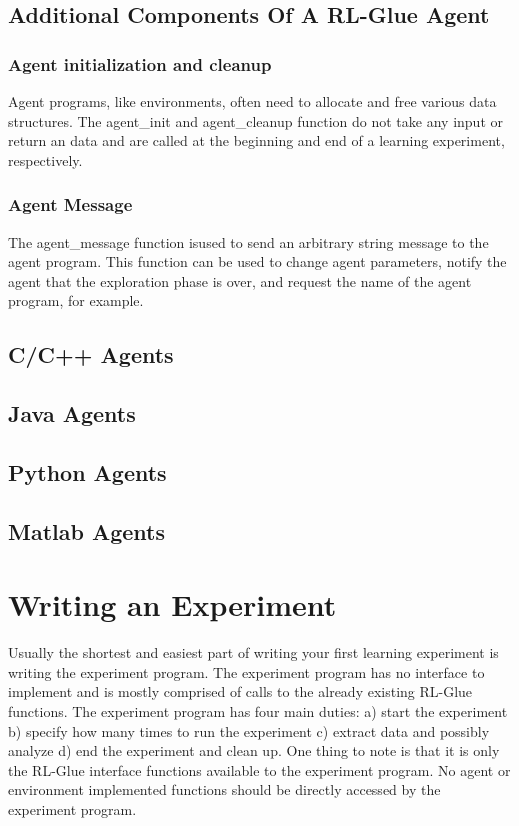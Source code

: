 \documentclass[11pt]{article}
\begin{document}
\subsection{Additional Components Of A RL-Glue Agent}
\subsubsection{Agent initialization and cleanup}
Agent programs, like environments, often need to allocate and free various data structures. The agent\_init and agent\_cleanup function do not take any input or return an data and are called at the beginning and end of a learning experiment, respectively.  

\subsubsection{Agent Message}
The agent\_message function isused to send an arbitrary string message to the agent program. This function can be used to change agent parameters, notify the agent that the exploration phase is over, and request the name of the agent program, for example.

\subsection{C/C++ Agents}
\subsection{Java Agents}
\subsection{Python Agents}
\subsection{Matlab Agents}

\section{Writing an Experiment}
\label{exp}
Usually the shortest and easiest part of writing your first learning experiment is writing the experiment program. The experiment program has no interface to implement and is mostly comprised of calls to the already existing RL-Glue functions. The experiment program has four main duties: a) start the experiment b) specify how many times to run the experiment c) extract data and possibly analyze d) end the experiment and clean up.  One thing to note is that it is only the RL-Glue interface functions available to the experiment program. No agent or environment implemented functions should be directly accessed by the experiment program.
\end{document}
